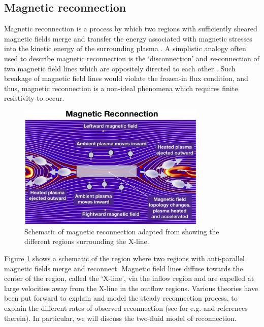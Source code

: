 \subsection{Magnetic reconnection}
Magnetic reconnection is a process by which two regions with sufficiently sheared magnetic fields merge and transfer the energy associated with magnetic stresses into the kinetic energy of the surrounding plasma \cite{Priest2000MagneticReconnection,Yamada2010MagneticReconnection}. A simplistic analogy often used to describe magnetic reconnection is the `disconnection' and \emph{re}-connection of two magnetic field lines which are oppositely directed to each other \cite{Gonzalez2016FundamentalReconnection}. Such breakage of magnetic field lines would violate the frozen-in flux condition, and thus, magnetic reconnection is a non-ideal phenomena which requires finite resistivity to occur. 

\begin{figure}
    \centering
    \includegraphics[width=0.8\textwidth]{images1/magnetic-reconnection-cartoon.png}
    \caption{Schematic of magnetic reconnection adapted from \protect{} showing the different regions surrounding the X-line.}
    \label{fig:chp1-reconnection-cartoon}
\end{figure}

Figure \ref{fig:chp1-reconnection-cartoon} shows a schematic of the region where two regions with anti-parallel magnetic fields merge and reconnect. Magnetic field lines diffuse towards the center of the region, called the `X-line', via the inflow region and are expelled at large velocities away from the X-line in the outflow regions. Various theories have been put forward to explain and model the steady reconnection process, to explain the different rates of observed reconnection (see for e.g.  and references therein). In particular, we will discuss the two-fluid model of reconnection. 

